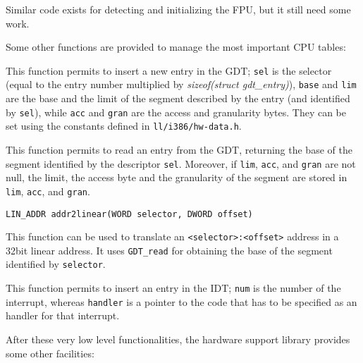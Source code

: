 \documentclass[a4paper]{report}
\begin{document}
Similar code exists for detecting and initializing the FPU, but it still
need some work.

Some other functions are provided to manage the most important CPU tables:


This function permits to insert a new entry in the GDT; {\tt sel}
is the selector (equal to the entry number multiplied by
{\em sizeof(struct gdt\_entry)}), {\tt base} and {\tt lim} are the
base and the limit of the segment described by the entry (and identified
by {\tt sel}), while {\tt acc} and {\tt gran} are the access and granularity
bytes. They can be set using the constants defined in
{\tt ll/i386/hw-data.h}.


This function permits to read an entry from the GDT, returning the
base of the segment identified by the descriptor {\tt sel}. Moreover,
if {\tt lim}, {\tt acc}, and {\tt gran} are not null, the limit, the
access byte and the granularity of the segment are stored in
{\tt *lim}, {\tt *acc}, and {\tt *gran}.

{\tt LIN\_ADDR addr2linear(WORD selector, DWORD offset)}

This function can be used to translate an {\tt <selector>:<offset>} address
in a 32bit linear address. It uses {\tt GDT\_read} for obtaining the
base of the segment identified by {\tt selector}.


This function permits to insert an entry in the IDT; {\tt num} is the
number of the interrupt, whereas {\tt handler} is a pointer to the
code that has to be specified as an handler for that interrupt.

%
After these very low level functionalities, the hardware support library
provides some other facilities:

\end{document}
